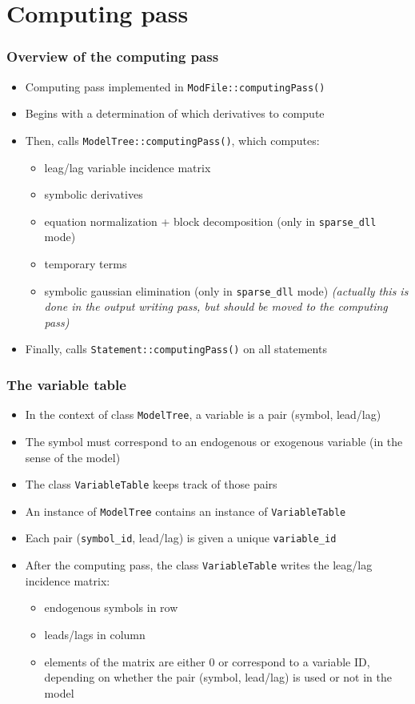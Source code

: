 \documentclass{beamer}
\begin{document}
\section{Computing pass}

\begin{frame}
  \frametitle{Overview of the computing pass}
  \begin{itemize}
  \item Computing pass implemented in \texttt{ModFile::computingPass()}
  \item Begins with a determination of which derivatives to compute
  \item Then, calls \texttt{ModelTree::computingPass()}, which computes:
    \begin{itemize}
    \item leag/lag variable incidence matrix
    \item symbolic derivatives
    \item equation normalization + block decomposition (only in \texttt{sparse\_dll} mode)
    \item temporary terms
    \item symbolic gaussian elimination (only in \texttt{sparse\_dll} mode) \textit{(actually this is done in the output writing pass, but should be moved to the computing pass)}
    \end{itemize}
  \item Finally, calls \texttt{Statement::computingPass()} on all statements
  \end{itemize}
\end{frame}

\begin{frame}
  \frametitle{The variable table}
  \begin{itemize}
  \item In the context of class \texttt{ModelTree}, a \alert{variable} is a pair (symbol, lead/lag)
  \item The symbol must correspond to an endogenous or exogenous variable (in the sense of the model)
  \item The class \texttt{VariableTable} keeps track of those pairs
  \item An instance of \texttt{ModelTree} contains an instance of \texttt{VariableTable}
  \item Each pair (\texttt{symbol\_id}, lead/lag) is given a unique \texttt{variable\_id}
  \item After the computing pass, the class \texttt{VariableTable} writes the leag/lag incidence matrix:
    \begin{itemize}
    \item endogenous symbols in row
    \item leads/lags in column
    \item elements of the matrix are either 0 or correspond to a variable ID, depending on whether the pair (symbol, lead/lag) is used or not in the model
    \end{itemize}
  \end{itemize}
\end{frame}
\end{document}
